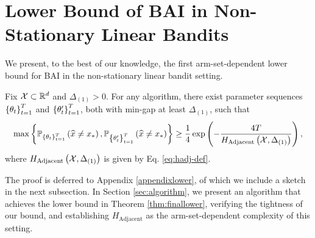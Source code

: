 \section{Lower Bound of BAI in Non-Stationary Linear Bandits} \label{sec:lower_bound}
We present, to the best of our knowledge, the first arm-set-dependent lower bound for BAI in the non-stationary linear bandit setting.
\begin{theorem}
    \label{thm:finallower}
    Fix $\mathcal{X} \subset \mathbb{R}^d$ and $\Delta_{(1)} > 0$. For any algorithm, there exist parameter sequences $\left\{\theta_t\right\}_{t=1}^{T}$ and $\left\{\theta'_t\right\}_{t=1}^{T}$, both with min-gap at least $\Delta_{(1)}$, such that \begin{equation}\label{eq:lower-main}
    \max\left\{\mathbb{P}_{\left\{\theta_t\right\}_{t=1}^{T}}\left(\widehat{x}\neq x_*\right), \mathbb{P}_{\left\{\theta'_t\right\}_{t=1}^{T}}\left(\widehat{x}\neq x_*\right)\right\}\geq\frac{1}{4}\exp\left(-\frac{4T}{H_{\mathrm{Adjacent}}\left(\mathcal{X}, \Delta_{(1)}\right)}\right),
    \end{equation}
    where $ H_{\mathrm{Adjacent}}\left(\mathcal{X}, \Delta_{(1)}\right)$ is given by Eq. \eqref{eq:hadj-def}.
\end{theorem}

The proof is deferred to Appendix \ref{appendixlower}, of which we include a sketch in the next subsection. In Section \ref{sec:algorithm}, we present an algorithm that achieves the lower bound in Theorem \ref{thm:finallower}, verifying the tightness of our bound, and establishing $ H_{\mathrm{Adjacent}}$ as the arm-set-dependent complexity of this setting.


